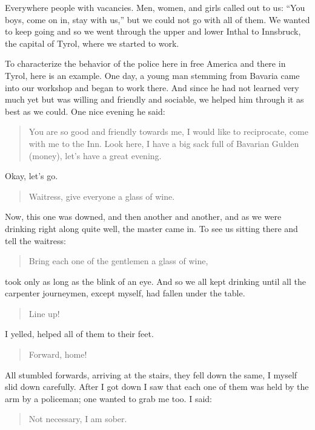 \documentclass{article}
\begin{document}
Everywhere people with vacancies. Men, women, and girls called out to us: ``You boys, come on in, stay with us,'' but we could not go with all of them. We wanted to keep going and so we went through the upper and lower Inthal to Innsbruck, the capital of Tyrol, where we started to work.

To characterize the behavior of the police here in free America and there in Tyrol, here is an example. One day, a young man stemming from Bavaria came into our workshop and began to work there. And since he had not learned very much yet but was willing and friendly and sociable, we helped him through it as best as we could. One nice evening he said:

\begin{quote}
You are so good and friendly towards me, I would like to reciprocate, come with me to the Inn. Look here, I have a big sack full of Bavarian Gulden (money), let's have a great evening.
\end{quote}

Okay, let's go.

\begin{quote}
Waitress, give everyone a glass of wine.
\end{quote}

Now, this one was downed, and then another and another, and as we were drinking right along quite well, the master came in. To see us sitting there and tell the waitress:

\begin{quote}
Bring each one of the gentlemen a glass of wine,
\end{quote}

took only as long as the blink of an eye. And so we all kept drinking until all the carpenter journeymen, except myself, had fallen under the table.

\begin{quote}
Line up!
\end{quote}

I yelled, helped all of them to their feet.

\begin{quote}
Forward, home!
\end{quote}

All stumbled forwards, arriving at the stairs, they fell down the same, I myself slid down carefully. After I got down I saw that each one of them was held by the arm by a policeman; one wanted to grab me too. I said:

\begin{quote}
Not necessary, I am sober.
\end{quote}
\end{document}
